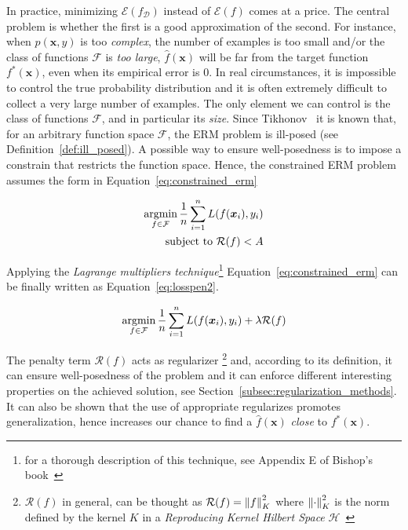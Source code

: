 In practice, minimizing $\mathcal{E}(f_{\mathcal{D}})$ instead of $\mathcal{E}(f)$ comes at a price. The central problem is whether the first is a good approximation of the second. For instance, when $p(\bm{x}, y)$ is too \textit{complex}, the number of examples is too small and/or the class of functions $\mathcal{F}$ is \textit{too large}, $\hat f(\bm{x})$ will be far from the target function $f^*(\bm{x})$, even when its empirical error is $0$. In real circumstances, it is impossible to control the true probability distribution and it is often extremely difficult to collect a very large number of examples. The only element we can control is the class of functions $\mathcal{F}$, and in particular its \textit{size}. Since Tikhonov~\cite{tikhonov1963solution} it is known that, for an arbitrary function space $\mathcal{F}$, the ERM problem is ill-posed (see Definition~\ref{def:ill_posed}). A possible way to ensure well-posedness is to impose a constrain that restricts the function space. Hence, the constrained ERM problem assumes the form in Equation~\eqref{eq:constrained_erm}

\begin{equation} \label{eq:constrained_erm}
	\begin{aligned}
		\mathop{\mathrm{argmin}}\limits_{f \in \mathcal{F}}{\frac{1}{n} \sum_{i=1}^{n} L(f(\bm{x}_i), y_i)} \\
		\text{subject to}~\mathcal{R}(f) < A
	\end{aligned}
\end{equation}

Applying the \textit{Lagrange multipliers technique}\footnote{for a thorough description of this technique, see Appendix E of Bishop's book~\cite{bishop2006pattern}} Equation~\eqref{eq:constrained_erm} can be finally written as Equation~\eqref{eq:losspen2}.

\begin{equation} \label{eq:losspen2}
	\mathop{\mathrm{argmin}}\limits_{f \in \mathcal{F}}{\frac{1}{n} \sum_{i=1}^{n} L(f(\bm{x}_i), y_i)} + \lambda \mathcal{R}(f)
\end{equation}

The penalty term $\mathcal{R}(f)$ acts as regularizer \footnote{$\mathcal{R}(f)$ in general, can be thought as $\mathcal{R}(f) = \left\lVert f\right\rVert^2_K$ where $\left\lVert\cdot\right\rVert^2_K$ is the norm defined by the kernel $K$ in a \textit{Reproducing Kernel Hilbert Space} $\mathcal{H}$~\cite{evgeniou2000regularization}}
and, according to its definition, it can ensure well-posedness of the problem and it can enforce different interesting properties on the achieved solution, see Section~\ref{subsec:regularization_methods}. It can also be shown that the use of appropriate regularizes promotes generalization, hence increases our chance to find a $\hat f(\bm{x})$ \textit{close} to $f^*(\bm{x})$.

